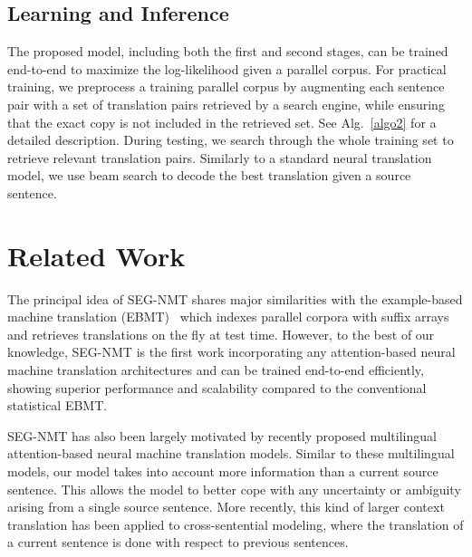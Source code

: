 \subsection{Learning and Inference}

The proposed model, including both the first and second stages, can be trained end-to-end to maximize the log-likelihood given a parallel corpus. For practical training, we preprocess a training parallel corpus by augmenting each sentence pair with a set of translation pairs retrieved by a search engine, while ensuring that the exact copy is not included in the retrieved set. See Alg.~\ref{algo2} for a detailed description. During testing, we search through the whole training set to retrieve relevant translation pairs. Similarly to a standard neural translation model, we use beam search to decode the best translation given a source sentence. 



\section{Related Work}

The principal idea of SEG-NMT shares major similarities with the example-based machine translation (EBMT)~\citep{Zhang2005AnEP,callison2005scaling,phillips2012modeling} which indexes parallel corpora with suffix arrays and retrieves translations on the fly at test time. However, to the best of our knowledge, SEG-NMT is the first work incorporating any attention-based neural machine translation architectures and can be trained end-to-end efficiently, showing superior performance and scalability compared to the conventional statistical EBMT. 


SEG-NMT has also been largely motivated by recently proposed multilingual attention-based neural machine translation models\citep{firat2016multi,zoph2016multi}. Similar to these multilingual models, our model takes into account more information than a current source sentence. This allows the model to better cope with any uncertainty or ambiguity arising from a single source sentence. More recently, this kind of larger context translation has been applied to cross-sentential modeling, where the translation of a current sentence is done with respect to previous sentences\citep{jean2017does,wang2017exploiting}. 

